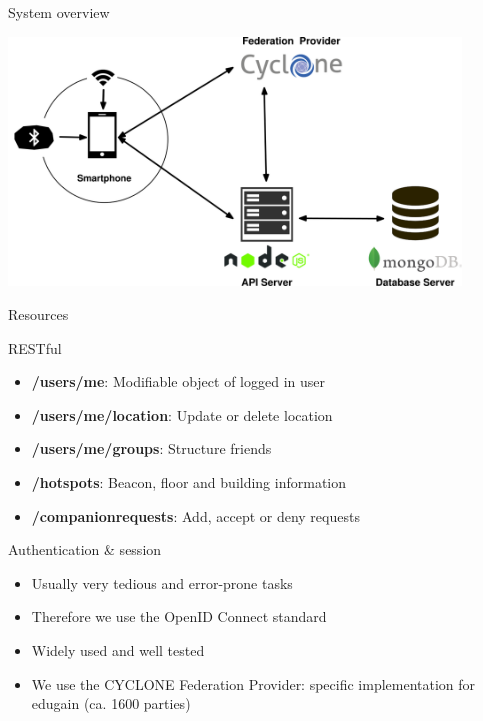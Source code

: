 \documentclass[11pt]{beamer}
\begin{document}
\begin{frame}{System overview}

  \begin{center}
    \includegraphics[width=0.9\textwidth]{architecture_v02}
  \end{center}

\end{frame}


\begin{frame}{Resources}

  RESTful

  \begin{itemize}
    \item \textbf{/users/me}: Modifiable object of logged in user
    \item \textbf{/users/me/location}: Update or delete location
    \item \textbf{/users/me/groups}: Structure friends
    \item \textbf{/hotspots}: Beacon, floor and building information
    \item \textbf{/companionrequests}: Add, accept or deny requests
  \end{itemize}

\end{frame}


\begin{frame}{Authentication \& session}

  \begin{itemize}
    \item Usually very tedious and error-prone tasks
    \item Therefore we use the OpenID Connect standard
    \item Widely used and well tested
    \item We use the CYCLONE Federation Provider: specific implementation for edugain (ca. 1600 parties)
  \end{itemize}

\end{frame}
\end{document}
